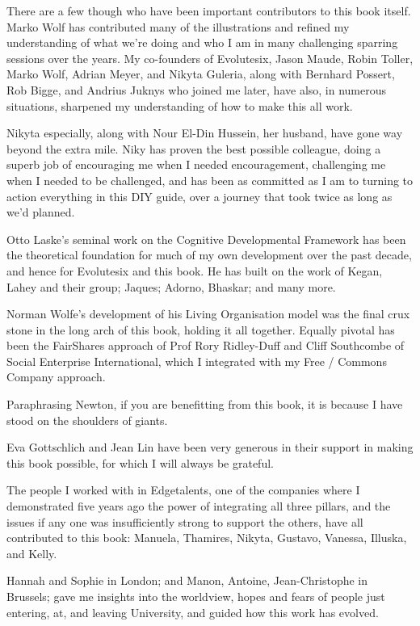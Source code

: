 There are a few though who have been important contributors to this book itself. Marko Wolf has contributed many of the illustrations and refined my understanding of what we're doing and who I am in many challenging sparring sessions over the years. My co-founders of Evolutesix, Jason Maude, Robin Toller, Marko Wolf, Adrian Meyer, and Nikyta Guleria, along with Bernhard Possert, Rob Bigge, and Andrius Juknys who joined me later, have also, in numerous situations, sharpened my understanding of how to make this all work. 


Nikyta especially, along with Nour El-Din Hussein, her husband, have gone way beyond the extra mile. Niky has proven the best possible colleague, doing a superb job of encouraging me when I needed encouragement, challenging me when I needed to be challenged, and has been as committed as I am to turning to action everything in this DIY guide, over a journey that took twice as long as we’d planned.


Otto Laske's seminal work on the Cognitive Developmental Framework has been the theoretical foundation for much of my own development over the past decade, and hence for Evolutesix and this book. He has built on the work of Kegan, Lahey and their group; Jaques; Adorno, Bhaskar; and many more. 


Norman Wolfe's development of his Living Organisation model was the final crux stone in the long arch of this book, holding it all together. Equally pivotal has been the FairShares approach of Prof Rory Ridley-Duff and Cliff Southcombe of Social Enterprise International, which I integrated with my Free / Commons Company approach.


Paraphrasing Newton, if you are benefitting from this book, it is because I have stood on the shoulders of giants. 


Eva Gottschlich and Jean Lin have been very generous in their support in making this book possible, for which I will always be grateful.


The people I worked with in Edgetalents, one of the companies where I demonstrated five years ago the power of integrating all three pillars, and the issues if any one was insufficiently strong to support the others, have all contributed to this book: Manuela, Thamires, Nikyta, Gustavo, Vanessa, Illuska, and Kelly.


Hannah and Sophie in London; and Manon, Antoine, Jean-Chris\-to\-phe in Brussels;  gave me insights into the worldview, hopes and fears of people just entering, at, and leaving University, and guided how this work has evolved.


